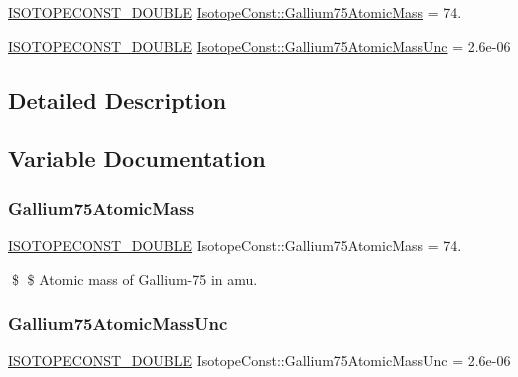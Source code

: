 \begin{DoxyCompactItemize}
\item 
\mbox{\hyperlink{group___isotope_const-_macros_ga8f45a7272ce02c0b4c65c44636ed719a}{I\+S\+O\+T\+O\+P\+E\+C\+O\+N\+S\+T\+\_\+\+D\+O\+U\+B\+LE}} \mbox{\hyperlink{group___isotope_const-_gallium-_ga75_ga573fcb55da37d42ecf5db9d440de8685}{Isotope\+Const\+::\+Gallium75\+Atomic\+Mass}} = 74.
\item 
\mbox{\hyperlink{group___isotope_const-_macros_ga8f45a7272ce02c0b4c65c44636ed719a}{I\+S\+O\+T\+O\+P\+E\+C\+O\+N\+S\+T\+\_\+\+D\+O\+U\+B\+LE}} \mbox{\hyperlink{group___isotope_const-_gallium-_ga75_ga94145c57264786add9f134a3d17b8459}{Isotope\+Const\+::\+Gallium75\+Atomic\+Mass\+Unc}} = 2.\+6e-\/06
\end{DoxyCompactItemize}


\subsection{Detailed Description}


\subsection{Variable Documentation}
\mbox{\label{group___isotope_const-_gallium-_ga75_ga573fcb55da37d42ecf5db9d440de8685}} 
\subsubsection{\texorpdfstring{Gallium75\+Atomic\+Mass}{Gallium75AtomicMass}}
{\footnotesize\ttfamily \mbox{\hyperlink{group___isotope_const-_macros_ga8f45a7272ce02c0b4c65c44636ed719a}{I\+S\+O\+T\+O\+P\+E\+C\+O\+N\+S\+T\+\_\+\+D\+O\+U\+B\+LE}} Isotope\+Const\+::\+Gallium75\+Atomic\+Mass = 74.}

\$ \$ Atomic mass of Gallium-\/75 in amu. \mbox{\label{group___isotope_const-_gallium-_ga75_ga94145c57264786add9f134a3d17b8459}} 
\subsubsection{\texorpdfstring{Gallium75\+Atomic\+Mass\+Unc}{Gallium75AtomicMassUnc}}
{\footnotesize\ttfamily \mbox{\hyperlink{group___isotope_const-_macros_ga8f45a7272ce02c0b4c65c44636ed719a}{I\+S\+O\+T\+O\+P\+E\+C\+O\+N\+S\+T\+\_\+\+D\+O\+U\+B\+LE}} Isotope\+Const\+::\+Gallium75\+Atomic\+Mass\+Unc = 2.\+6e-\/06}

